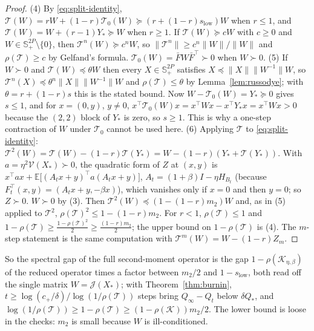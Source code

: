 \documentclass[11pt]{article}
\theoremstyle{remark}
\newcommand{\E}{\mathbb{E}}
\begin{document}
\begin{proof}
(4) By \eqref{eq:split-identity}, $\mathcal T(W)=rW+(1-r)\mathcal T_0(W)\succeq(r+(1-r)s_{\mathrm{low}})W$ when $r\le1$, and $\mathcal T(W)=W+(r-1)Y_*\succeq W$ when $r\ge1$. If $\mathcal T(W)\succeq cW$ with $c\ge0$ and $W\in\mathbb S^{2P}_+\setminus\{0\}$, then $\mathcal T^n(W)\succeq c^nW$, so $\|\mathcal T^n\|\ge c^n\|W\|/\|W\|$ and $\rho(\mathcal T)\ge c$ by Gelfand's formula. $\mathcal T_0(W)=\bar FW\bar F^\top\succ0$ when $W\succ0$.
(5) If $W\succ0$ and $\mathcal T(W)\preceq\theta W$ then every $X\in\mathbb S^{2P}_+$ satisfies $X\preceq\|X\|\|W^{-1}\|W$, so $\mathcal T^n(X)\preceq\theta^n\|X\|\|W^{-1}\|W$ and $\rho(\mathcal T)\le\theta$ by Lemma~\ref{lem:russodye}; with $\theta=r+(1-r)s$ this is the stated bound. Now $W-\mathcal T_0(W)=Y_*\succeq0$ gives $s\le1$, and for $x=(0,y)$, $y\ne0$, $x^\top\mathcal T_0(W)x=x^\top Wx-x^\top Y_*x=x^\top Wx>0$ because the $(2,2)$ block of $Y_*$ is zero, so $s\ge1$. This is why a one-step contraction of $W$ under $\mathcal T_0$ cannot be used here.
(6) Applying $\mathcal T$ to \eqref{eq:split-identity}: $\mathcal T^2(W)=\mathcal T(W)-(1-r)\mathcal T(Y_*)=W-(1-r)(Y_*+\mathcal T(Y_*))$. With $a=\eta^2\mathcal V(X_*)\succ0$, the quadratic form of $Z$ at $(x,y)$ is $x^\top ax+\E\big[(A_tx+y)^\top a(A_tx+y)\big]$, $A_t=(1+\beta)I-\eta H_{B_t}$ (because $F_t^\top(x,y)=(A_tx+y,-\beta x)$), which vanishes only if $x=0$ and then $y=0$; so $Z\succ0$. $W\succ0$ by (3). Then $\mathcal T^2(W)\preceq(1-(1-r)m_2)W$ and, as in (5) applied to $\mathcal T^2$, $\rho(\mathcal T)^2\le1-(1-r)m_2$. For $r<1$, $\rho(\mathcal T)\le1$ and $1-\rho(\mathcal T)\ge\frac{1-\rho(\mathcal T)^2}{2}\ge\frac{(1-r)m_2}2$; the upper bound on $1-\rho(\mathcal T)$ is (4). The $m$-step statement is the same computation with $\mathcal T^m(W)=W-(1-r)Z_m$.
\end{proof}

So the spectral gap of the full second-moment operator is the gap $1-\rho(\mathcal K_{\eta,\beta})$ of the reduced operator times a factor between $m_2/2$ and $1-s_{\mathrm{low}}$, both read off the single matrix $W=\mathcal J(X_*)$; with Theorem~\ref{thm:burnin}, $t\ge\log(c_+/\delta)/\log(1/\rho(\mathcal T))$ steps bring $Q_\infty-Q_t$ below $\delta Q_*$, and $\log(1/\rho(\mathcal T))\ge1-\rho(\mathcal T)\ge(1-\rho(\mathcal K))m_2/2$. The lower bound is loose in the checks: $m_2$ is small because $W$ is ill-conditioned.
\end{document}
